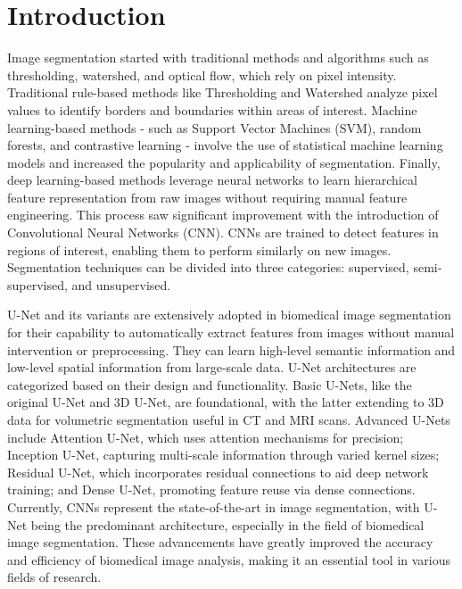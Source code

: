 \documentclass[./dissertation.tex]{subfiles}
\begin{document}
\chapter{Introduction}



Image segmentation started with traditional methods and algorithms such as thresholding, watershed, and optical flow, which rely on pixel intensity. Traditional rule-based methods like Thresholding and Watershed analyze pixel values to identify borders and boundaries within areas of interest. Machine learning-based methods - such as Support Vector Machines (SVM), random forests, and contrastive learning - involve the use of statistical machine learning models and increased the popularity and applicability of segmentation. Finally, deep learning-based methods leverage neural networks to learn hierarchical feature representation from raw images without requiring manual feature engineering. This process saw significant improvement with the introduction of Convolutional Neural Networks (CNN). CNNs are trained to detect features in regions of interest, enabling them to perform similarly on new images. Segmentation techniques can be divided into three categories: supervised, semi-supervised, and unsupervised.

U-Net and its variants are extensively adopted in biomedical image segmentation for their capability to automatically extract features from images without manual intervention or preprocessing. They can learn high-level semantic information and low-level spatial information from large-scale data. U-Net architectures are categorized based on their design and functionality. Basic U-Nets, like the original U-Net and 3D U-Net, are foundational, with the latter extending to 3D data for volumetric segmentation useful in CT and MRI scans. Advanced U-Nets include Attention U-Net, which uses attention mechanisms for precision; Inception U-Net, capturing multi-scale information through varied kernel sizes; Residual U-Net, which incorporates residual connections to aid deep network training; and Dense U-Net, promoting feature reuse via dense connections. Currently, CNNs represent the state-of-the-art in image segmentation, with U-Net being the predominant architecture, especially in the field of biomedical image segmentation. These advancements have greatly improved the accuracy and efficiency of biomedical image analysis, making it an essential tool in various fields of research.
\end{document}
